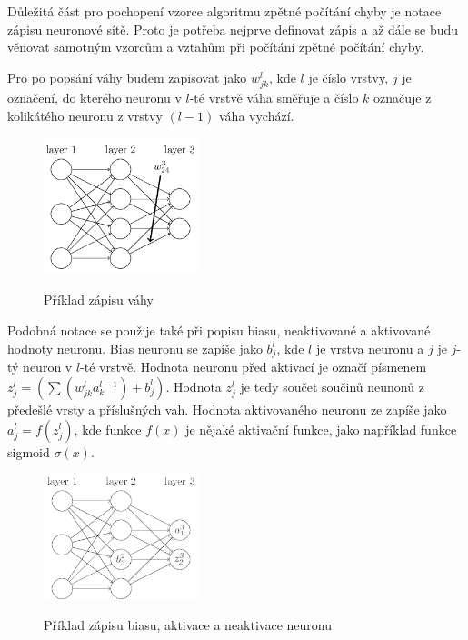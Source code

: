 Důležitá část pro pochopení vzorce algoritmu zpětné počítání chyby je notace zápisu neuronové sítě.
Proto je potřeba nejprve definovat zápis a až dále se budu věnovat samotným vzorcům a vztahům při počítání zpětné počítání chyby.

Pro po popsání váhy budem zapisovat jako \(w_{jk}^l\), kde \(l\) je číslo vrstvy, \(j\) je označení,
do kterého neuronu v \(l\)-té vrstvě váha směřuje a číslo \(k\) označuje z kolikátého neuronu z vrstvy \((l-1)\) váha vychází.

\begin{figure}[h]
    \centering
    \includegraphics[width=0.4\textwidth]{images/vaha_v_siti.png}
    \caption{Příklad zápisu váhy}\cite{vaha_v_siti}
\end{figure}

Podobná notace se použije také při popisu biasu, neaktivované a aktivované hodnoty neuronu.
Bias neuronu se zapíše jako \(b_{j}^l\), kde \(l\) je vrstva neuronu a \(j\) je \(j\)-tý neuron v \(l\)-té vrstvě.
Hodnota neuronu před aktivací je označí písmenem \(z_{j}^{l} = \left( \sum (w^{l}_{jk} a^{l-1}_k) + b^l_j \right)\).
Hodnota \(z_j^l\) je tedy součet součinů neunonů z předešlé vrsty a příslušných vah.
Hodnota aktivovaného neuronu ze zapíše jako \(a_j^l = f(z_j^l)\), kde funkce \(f(x)\) je nějaké aktivační funkce,
jako například funkce sigmoid \(\sigma(x)\).

\begin{figure}[h]
    \centering
    \includegraphics[width=0.4\textwidth]{images/bias_a_neuron.png}
    \caption{Příklad zápisu biasu, aktivace a neaktivace neuronu} \cite{bias_a_neuron}
\end{figure}

